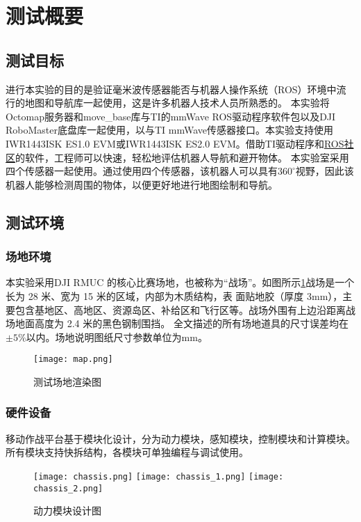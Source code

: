 \documentclass[lang=cn,11pt,a4paper]{elegantpaper}
\begin{document}
\section{测试概要}

\subsection{测试目标}
进行本实验的目的是验证毫米波传感器能否与机器人操作系统（ROS）环境中流行的地图和导航库一起使用，这是许多机器人技术人员所熟悉的。
本实验将Octomap服务器和move\_base库与TI的mmWave ROS驱动程序软件包以及DJI RoboMaster底盘库一起使用，以与TI mmWave传感器接口。本实验支持使用IWR1443ISK ES1.0 EVM或IWR1443ISK ES2.0 EVM。借助TI驱动程序和\href{ros.org}{ROS社区}的软件，工程师可以快速，轻松地评估机器人导航和避开物体。
本实验室采用四个传感器一起使用。通过使用四个传感器，该机器人可以具有$360^{\circ}$视野，因此该机器人能够检测周围的物体，以便更好地进行地图绘制和导航。

\subsection{测试环境}
\subsubsection{场地环境}
本实验采用DJI RMUC 的核心比赛场地，也被称为“战场”。如图所示\ref{fig:map}战场是一个长为 28 米、宽为 15 米的区域，内部为木质结构，表
面贴地胶（厚度 3mm），主要包含基地区、高地区、资源岛区、补给区和飞行区等。战场外围有上边沿距离战场地面高度为 2.4 米的黑色钢制围挡。
全文描述的所有场地道具的尺寸误差均在$±5\%$以内。场地说明图纸尺寸参数单位为mm。

\begin{figure}[htbp]
  \centering
  \texttt{[image: map.png]}
  \caption{测试场地渲染图}
  \label{fig:map}
\end{figure}

\subsubsection{硬件设备}
移动作战平台基于模块化设计，分为动力模块，感知模块，控制模块和计算模块。所有模块支持快拆结构，各模块可单独编程与调试使用。
\begin{figure}[htbp]
  \centering
  {\texttt{[image: chassis.png]}}
  {\texttt{[image: chassis\_1.png]}}
  {\texttt{[image: chassis\_2.png]}}
  \caption{动力模块设计图}
  \label{fig:chassis}
\end{figure}
\end{document}
